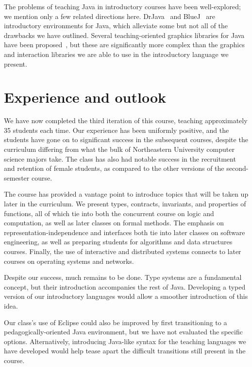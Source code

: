 \documentclass[submission,copyright]{eptcs}
\begin{document}
The problems of teaching Java in introductory courses have been
well-explored; we mention only a few related directions here.
DrJava~\cite{dvanhorn:Allen2002DrJava} and
BlueJ~\cite{dvanhorn:Hsia2005Taming,dvanhorn:Kolling2003} are
introductory environments for Java, which alleviate some but not all
of the drawbacks we have outlined.
%
Several teaching-oriented graphics libraries for Java have been
proposed~\cite{dvanhorn:Bruce2001Library,dvanhorn:Alphonce2003Using},
but these are significantly more complex than the graphics and
interaction libraries we are able to use in the introductory language
we present.


\section{Experience and outlook}
\label{sec:conclusion}

We have now completed the third iteration of this course, teaching
approximately 35 students each time.  Our experience has been
uniformly positive, and the students have gone on to significant
success in the subsequent courses, despite the curriculum differing
from what the bulk of Northeastern University computer science majors
take.  The class has also had notable success in the recruitment and
retention of female students, as compared to the other versions of the
second-semester course.

The course has provided a vantage point to introduce topics that will
be taken up later in the curriculum.  We present types, contracts,
invariants, and properties of functions, all of which tie into both
the concurrent course on logic and computation, as well as later
classes on formal methods.  The emphasis on
representation-independence and interfaces both tie into later classes
on software engineering, as well as preparing students for algorithms
and data structures courses.  Finally, the use of interactive and
distributed systems connects to later courses on operating systems and
networks.

Despite our success, much remains to be done.  Type systems are a
fundamental concept, but their introduction accompanies the rest of
Java.  Developing a typed version of our introductory languages would
allow a smoother introduction of this idea.  

Our class's use of Eclipse could also be improved by first
transitioning to a pedagogically-oriented Java environment, but we
have not evaluated the specific options.  Alternatively, introducing
Java-like syntax for the teaching languages we have developed would
help tease apart the difficult transitions still present in the course.
\end{document}

